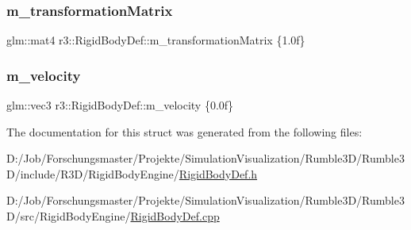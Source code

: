 \mbox{\label{structr3_1_1_rigid_body_def_a5110c4790357fbbfad4d5cc5dd89c4d6}} 
\subsubsection{\texorpdfstring{m\+\_\+transformation\+Matrix}{m\_transformationMatrix}}
{\footnotesize\ttfamily glm\+::mat4 r3\+::\+Rigid\+Body\+Def\+::m\+\_\+transformation\+Matrix \{1.\+0f\}}

\mbox{\label{structr3_1_1_rigid_body_def_a3acdc6c652745324b72165c6fc42bc39}} 
\subsubsection{\texorpdfstring{m\+\_\+velocity}{m\_velocity}}
{\footnotesize\ttfamily glm\+::vec3 r3\+::\+Rigid\+Body\+Def\+::m\+\_\+velocity \{0.\+0f\}}



The documentation for this struct was generated from the following files\+:\begin{DoxyCompactItemize}
\item 
D\+:/\+Job/\+Forschungsmaster/\+Projekte/\+Simulation\+Visualization/\+Rumble3\+D/\+Rumble3\+D/include/\+R3\+D/\+Rigid\+Body\+Engine/\mbox{\hyperlink{_rigid_body_def_8h}{Rigid\+Body\+Def.\+h}}\item 
D\+:/\+Job/\+Forschungsmaster/\+Projekte/\+Simulation\+Visualization/\+Rumble3\+D/\+Rumble3\+D/src/\+Rigid\+Body\+Engine/\mbox{\hyperlink{_rigid_body_def_8cpp}{Rigid\+Body\+Def.\+cpp}}\end{DoxyCompactItemize}
